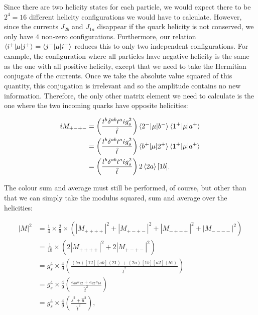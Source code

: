 Since there are two helicity states for each particle, we would expect there to be $2^4 = 16$ different helicity configurations we would have to calculate. However, since the currents $J_{2b}$ and $J_{1a}$ disappear if the quark helicity is not conserved, we only have $4$ non-zero configurations. Furthermore, our relation $\mathinner{\langle i^+\vert\mu\vert j^+\rangle}_{} = \mathinner{\langle j^-\vert\mu\vert i^-\rangle}_{}$ reduces this to only two independent configurations. For example, the configuration where all particles have negative helicity is the same as the one with all positive helicity, except that we need to take the Hermitian conjugate of the currents. Once we take the absolute value squared of this quantity, this conjugation is irrelevant and so the amplitude contains no new information. Therefore, the only other matrix element we need to calculate is the one where the two incoming quarks have opposite helicities:

\begin{equation}
\begin{split}
iM_{+-+-} & =  \left(\frac{t^b \delta^{ab} t^a i g_s^2}{\hat{t}} \right) \mathinner{\langle2^-\vert\mu\vert b^-\rangle}_{} \mathinner{\langle1^+\vert\mu\vert a^+\rangle}_{} \\
&=  \left(\frac{t^b \delta^{ab} t^a i g_s^2}{\hat{t}} \right) \mathinner{\langle b^+\vert\mu\vert2^+\rangle}_{} \mathinner{\langle1^+\vert\mu\vert a^+\rangle}_{} \\
&=  \left(\frac{t^b \delta^{ab} t^a i g_s^2}{\hat{t}} \right) 2 \left<2 a \right> [1 b].
\end{split}
\end{equation}

The colour sum and average must still be performed, of course, but other than that we can simply take the modulus squared, sum and average over the helicities:

\begin{equation}
\begin{split}
|M|^2 &= \frac{1}{4} \times \frac{2}{9} \times \left(|M_{++++}|^2 + |M_{+-+-}|^2  + |M_{-+-+}|^2  + |M_{----}|^2 \right) \\
&= \frac{1}{18} \times \left(2 |M_{++++}|^2 + 2 |M_{+-+-}|^2 \right) \\
&= g_s^4 \times \frac{4}{9} \left(\frac{ \left<b a \right> [1 2] [ab] \left<2 1 \right> + \left<2 a \right> [1 b] [a2] \left<b 1 \right> }{\hat{t}^2}\right) \\
&=  g_s^4 \times \frac{4}{9} \left(\frac{s_{ab} s_{12} + s_{a2}s_{1b} }{\hat{t}^2} \right) \\
&= g_s^4 \times \frac{4}{9} \left(\frac{\hat{s}^2 + \hat{u}^2}{\hat{t}^2} \right),
\end{split}
\end{equation}

